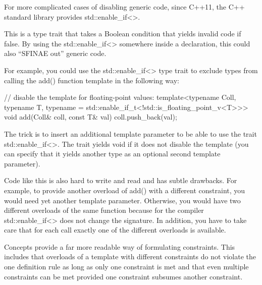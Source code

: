 For more complicated cases of disabling generic code, since C++11, the C++ standard library provides std::enable\_if<>.

This is a type trait that takes a Boolean condition that yields invalid code if false. By using the std::enable\_if<> somewhere inside a declaration, this could also “SFINAE out” generic code.

For example, you could use the std::enable\_if<> type trait to exclude types from calling the add() function template in the following way:

\begin{cpp}
// disable the template for floating-point values:
template<typename Coll, typename T,
typename = std::enable_if_t<!std::is_floating_point_v<T>>>
void add(Coll& coll, const T& val)
{
	coll.push_back(val);
}
\end{cpp}

The trick is to insert an additional template parameter to be able to use the trait std::enable\_if<>. The trait yields void if it does not disable the template (you can specify that it yields another type as an optional second template parameter).

Code like this is also hard to write and read and has subtle drawbacks. For example, to provide another overload of add() with a different constraint, you would need yet another template parameter. Otherwise, you would have two different overloads of the same function because for the compiler std::enable\_if<> does not change the signature. In addition, you have to take care that for each call exactly one of the different overloads is available.

Concepts provide a far more readable way of formulating constraints. This includes that overloads of a template with different constraints do not violate the one definition rule as long as only one constraint is met and that even multiple constraints can be met provided one constraint subsumes another constraint.




